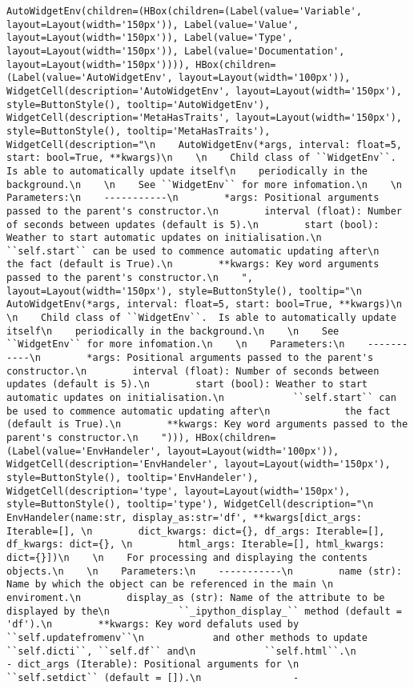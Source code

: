 \documentclass[11pt]{article}
\begin{document}
    \begin{verbatim}
AutoWidgetEnv(children=(HBox(children=(Label(value='Variable', layout=Layout(width='150px')), Label(value='Value', layout=Layout(width='150px')), Label(value='Type', layout=Layout(width='150px')), Label(value='Documentation', layout=Layout(width='150px')))), HBox(children=(Label(value='AutoWidgetEnv', layout=Layout(width='100px')), WidgetCell(description='AutoWidgetEnv', layout=Layout(width='150px'), style=ButtonStyle(), tooltip='AutoWidgetEnv'), WidgetCell(description='MetaHasTraits', layout=Layout(width='150px'), style=ButtonStyle(), tooltip='MetaHasTraits'), WidgetCell(description="\n    AutoWidgetEnv(*args, interval: float=5, start: bool=True, **kwargs)\n    \n    Child class of ``WidgetEnv``.  Is able to automatically update itself\n    periodically in the background.\n    \n    See ``WidgetEnv`` for more infomation.\n    \n    Parameters:\n    -----------\n        *args: Positional arguments passed to the parent's constructor.\n        interval (float): Number of seconds between updates (default is 5).\n        start (bool): Weather to start automatic updates on initialisation.\n            ``self.start`` can be used to commence automatic updating after\n             the fact (default is True).\n        **kwargs: Key word arguments passed to the parent's constructor.\n    ", layout=Layout(width='150px'), style=ButtonStyle(), tooltip="\n    AutoWidgetEnv(*args, interval: float=5, start: bool=True, **kwargs)\n    \n    Child class of ``WidgetEnv``.  Is able to automatically update itself\n    periodically in the background.\n    \n    See ``WidgetEnv`` for more infomation.\n    \n    Parameters:\n    -----------\n        *args: Positional arguments passed to the parent's constructor.\n        interval (float): Number of seconds between updates (default is 5).\n        start (bool): Weather to start automatic updates on initialisation.\n            ``self.start`` can be used to commence automatic updating after\n             the fact (default is True).\n        **kwargs: Key word arguments passed to the parent's constructor.\n    "))), HBox(children=(Label(value='EnvHandeler', layout=Layout(width='100px')), WidgetCell(description='EnvHandeler', layout=Layout(width='150px'), style=ButtonStyle(), tooltip='EnvHandeler'), WidgetCell(description='type', layout=Layout(width='150px'), style=ButtonStyle(), tooltip='type'), WidgetCell(description="\n    EnvHandeler(name:str, display_as:str='df', **kwargs[dict_args: Iterable=[], \n        dict_kwargs: dict={}, df_args: Iterable=[], df_kwargs: dict={}, \n        html_args: Iterable=[], html_kwargs: dict={}])\n    \n    For processing and displaying the contents objects.\n    \n    Parameters:\n    -----------\n        name (str): Name by which the object can be referenced in the main \n            enviroment.\n        display_as (str): Name of the attribute to be displayed by the\n            ``_ipython_display_`` method (default = 'df').\n        **kwargs: Key word defaluts used by ``self.updatefromenv``\n            and other methods to update ``self.dicti``, ``self.df`` and\n            ``self.html``.\n                - dict_args (Iterable): Positional arguments for \n                    ``self.setdict`` (default = []).\n                - 
\end{verbatim}
\end{document}
